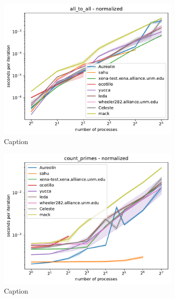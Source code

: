 \documentclass{article}
\begin{document}
\begin{figure}[h]
    \centering
    \includegraphics[width=0.8\textwidth]{figures/draft/all_to_all_normalized.pdf}
    \caption{Caption}
    \label{fig:all_to_all_normalized}
\end{figure}

\begin{figure}[h]
    \centering
    \includegraphics[width=0.8\textwidth]{figures/draft/count_primes_normalized.pdf}
    \caption{Caption}
    \label{fig:count_primes_normalized}
\end{figure}
\end{document}
